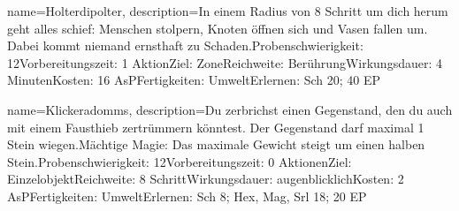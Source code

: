{
    name={Holterdipolter},
    description={In einem Radius von 8 Schritt um dich herum geht alles schief: Menschen stolpern, Knoten öffnen sich und Vasen fallen um. Dabei kommt niemand ernsthaft zu Schaden.\newline Probenschwierigkeit: 12\newline Vorbereitungszeit: 1 Aktion\newline Ziel: Zone\newline Reichweite: Berührung\newline Wirkungsdauer: 4 Minuten\newline Kosten: 16 AsP\newline Fertigkeiten: Umwelt\newline Erlernen: Sch 20; 40 EP}
}


{
    name={Klickeradomms},
    description={Du zerbrichst einen Gegenstand, den du auch mit einem Fausthieb zertrümmern könntest. Der Gegenstand darf maximal 1 Stein wiegen.\newline Mächtige Magie: Das maximale Gewicht steigt um einen halben Stein.\newline Probenschwierigkeit: 12\newline Vorbereitungszeit: 0 Aktionen\newline Ziel: Einzelobjekt\newline Reichweite: 8 Schritt\newline Wirkungsdauer: augenblicklich\newline Kosten: 2 AsP\newline Fertigkeiten: Umwelt\newline Erlernen: Sch 8; Hex, Mag, Srl 18; 20 EP}
}


